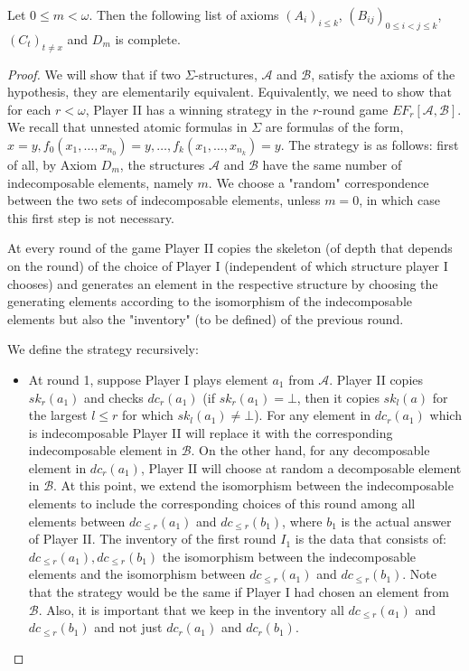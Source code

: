 \documentclass[10pt,a4paper]{amsart}
\begin{document}
\begin{theorem}\label{IndecomposableEquivalentElementary}
Let $0\leq m<\omega$. Then the following list of axioms $(A_i)_{i\leq k}$, $(B_{ij})_{0\leq i<j\leq k}$, $(C_t)_{t\neq x}$ and $D_m$ is complete. 
\end{theorem}

\begin{proof}
We will show that if two $\Sigma$-structures, $\mathcal{A}$ and $\mathcal{B}$, satisfy the axioms of the hypothesis, they are elementarily equivalent. Equivalently, we need to show that for each $r<\omega$, Player II has a winning strategy in the $r$-round game $EF_r[\mathcal{A}, \mathcal{B}]$. We recall that unnested atomic formulas in $\Sigma$ are formulas of the form, $x=y, f_0(x_1, \ldots, x_{n_0})=y, \ldots, f_k(x_1,\ldots, x_{n_k})=y$. The strategy is as follows: first of all, by Axiom $D_m$, the structures $\mathcal{A}$ and $\mathcal{B}$ have the same number of indecomposable elements, namely $m$. We choose a "random" correspondence between the two sets of indecomposable elements, unless $m=0$, in which case this first step is not necessary. 

At every round of the game Player II copies the skeleton (of depth that depends on the round) of the choice of Player I (independent of which structure player I chooses) and generates an element in the respective structure by choosing the generating elements according to the isomorphism of the indecomposable elements but also the "inventory" (to be defined) of the previous round.

We define the strategy recursively:
\begin{itemize}
\item At round 1, suppose Player I plays element $a_1$ from $\mathcal{A}$. Player II copies $sk_r(a_1)$ and checks $dc_r(a_1)$ (if $sk_r(a_1)=\bot$, then it copies $sk_l(a)$ for the largest $l\leq r$ for which $sk_l(a_1)\neq\bot$). For any element in $dc_r(a_1)$ which is indecomposable Player II will replace it with the corresponding indecomposable element in $\mathcal{B}$. On the other hand,  for any decomposable element in $dc_r(a_1)$, Player II will choose at random a decomposable element in $\mathcal{B}$. 
At this point, we extend the isomorphism between the indecomposable elements to include the corresponding choices of this round among all elements between $dc_{\leq r}(a_1)$ and $dc_{\leq r}(b_1)$, where $b_1$ is the actual answer of Player II. The inventory of the first round $I_1$ is the data that consists of: $dc_{\leq r}(a_1), dc_{\leq r}(b_1)$ the isomorphism between the indecomposable elements and the isomorphism between $dc_{\leq r}(a_1)$ and $ dc_{\leq r}(b_1)$. Note that the strategy would be the same if Player I had chosen an element from $\mathcal{B}$. Also, it is important that we keep in the inventory all $dc_{\leq r}(a_1)$ and $ dc_{\leq r}(b_1)$ and not just $dc_{r}(a_1)$ and $ dc_{r}(b_1)$.


\end{itemize}
\end{proof}
\end{document}
